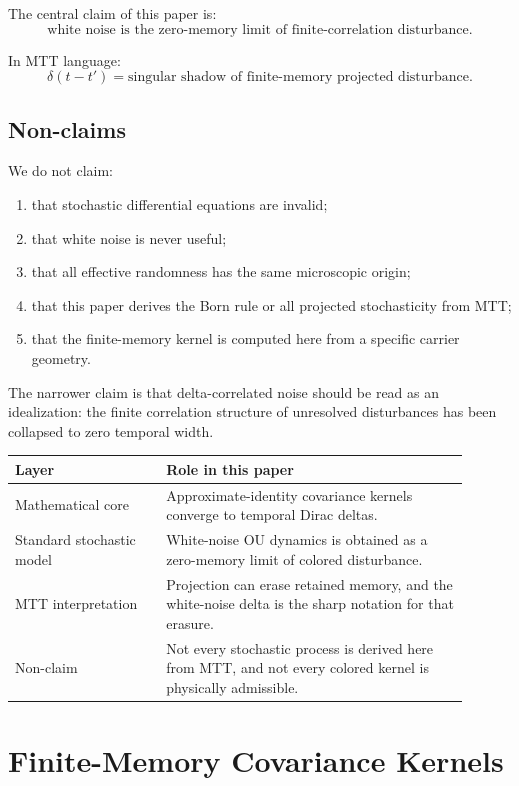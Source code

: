\documentclass[11pt]{article}
\begin{document}
The central claim of this paper is:
\[
\boxed{\text{white noise is the zero-memory limit of finite-correlation disturbance}.}
\]

In MTT language:
\[
\boxed{\delta(t-t')=\text{singular shadow of finite-memory projected disturbance}.}
\]

\subsection{Non-claims}

We do not claim:
\begin{enumerate}
\item that stochastic differential equations are invalid;
\item that white noise is never useful;
\item that all effective randomness has the same microscopic origin;
\item that this paper derives the Born rule or all projected stochasticity from MTT;
\item that the finite-memory kernel is computed here from a specific carrier geometry.
\end{enumerate}

The narrower claim is that delta-correlated noise should be read as an idealization: the finite correlation structure of unresolved disturbances has been collapsed to zero temporal width.

\begin{center}
\begin{tabular}{p{0.30\linewidth}p{0.60\linewidth}}
\toprule
Layer & Role in this paper \\
\midrule
Mathematical core & Approximate-identity covariance kernels converge to temporal Dirac deltas. \\
Standard stochastic model & White-noise OU dynamics is obtained as a zero-memory limit of colored disturbance. \\
MTT interpretation & Projection can erase retained memory, and the white-noise delta is the sharp notation for that erasure. \\
Non-claim & Not every stochastic process is derived here from MTT, and not every colored kernel is physically admissible. \\
\bottomrule
\end{tabular}
\end{center}

\section{Finite-Memory Covariance Kernels}
\end{document}
